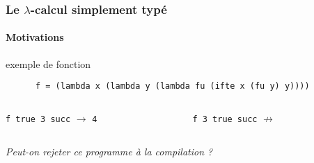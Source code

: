 \documentclass{beamer}
\begin{document}
\begin{frame}[b,fragile]
\frametitle{Le $\lambda$-calcul simplement typé}
\framesubtitle{Motivations} 

\begin{block}{exemple de fonction}
  \begin{minipage}{.5\linewidth}
    \begin{lstlisting}
      f = (lambda x (lambda y (lambda fu (ifte x (fu y) y))))
    \end{lstlisting}
  \end{minipage}
\end{block}


\vfill

\begin{columns}
  \begin{column}{.3\linewidth}
    \lstinline!f true 3 succ! $\rightarrow$ \lstinline!4!
  \end{column}
  \begin{column}{.3\linewidth}
    \lstinline!f 3 true succ! $\not\rightarrow$
  \end{column}
\end{columns}


\vfill

\begin{flushright}
  \large{\textit{Peut-on rejeter ce programme à la compilation ?}}
\end{flushright}


\end{frame}
\end{document}
